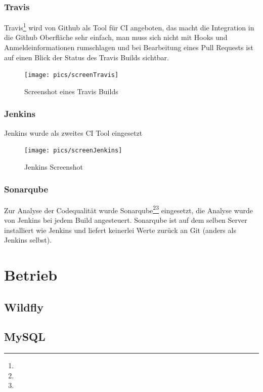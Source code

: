 \documentclass[12pt,a4paper,parskip]{scrreprt}
\begin{document}
\subsubsection{Travis}
Travis\footnote{} wird von Github als Tool für CI angeboten, das macht die Integration in die Github Oberfläche sehr einfach, man muss sich nicht mit Hooks und Anmeldeinformationen rumschlagen und bei Bearbeitung eines Pull Requests ist auf einen Blick der Status des Travis Builds sichtbar.
\begin{figure}[h]
\centering
\texttt{[image: pics/screenTravis]}
\caption[Travis]{Screenshot eines Travis Builds}
\label{fig:screenTravis}
\end{figure}

\subsubsection{Jenkins}
Jenkins wurde als zweites CI Tool eingesetzt
\begin{figure}[h]
\centering
\texttt{[image: pics/screenJenkins]}
\caption[Jenkins]{Jenkins Screenshot}
\label{fig:screenJenkins}
\end{figure}

\subsubsection{Sonarqube}
Zur Analyse der Codequalität wurde Sonarqube\footnote{}\footnote{} eingesetzt, die Analyse wurde von Jenkins bei jedem Build angesteuert. Sonarqube ist auf dem selben Server installiert wie Jenkins und liefert keinerlei Werte zurück an Git (anders als Jenkins selbst).


\section{Betrieb}
\subsection{Wildfly}
\subsection{MySQL}
\end{document}
